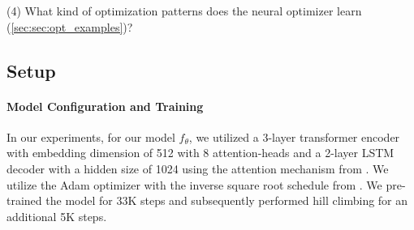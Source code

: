 \documentclass{article}
\begin{document}
(4) What kind of optimization patterns does the neural optimizer learn (\cref{sec:sec:opt_examples})?






\subsection{Setup}
\label{sec:setup}

\paragraph{Model Configuration and Training} In our experiments, for our model $f_{\theta}$, we utilized a 3-layer transformer encoder with embedding dimension of 512 with 8 attention-heads and a 2-layer LSTM decoder with a hidden size of 1024 using the attention mechanism from \citet{bahdanau2014neural}. We utilize the Adam optimizer \cite{kingma2014adam} with the inverse square root schedule from \citet{vaswani2017attention}. We pre-trained the model for 33K steps and subsequently performed hill climbing for an additional 5K steps. 
\end{document}
